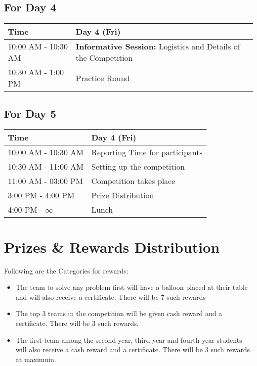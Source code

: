 \documentclass[12pt]{article}
\begin{document}
\subsection*{\centering For Day 4}
\begin{table}[H]
    \centering
    \begin{tabular}{|p{2.1cm}|p{12.9cm}|}
    \hline
    Time & Day 4 (Fri) \\ 
    \hline
    10:00 AM - 10:30 AM & \textbf{Informative Session:} Logistics and Details of the Competition \\
    \hline
    10:30 AM - 1:00 PM & Practice Round \\
    \hline
    \end{tabular}
\end{table}

\subsection*{\centering For Day 5}
\begin{table}[H]
    \centering
    \begin{tabular}{|p{2.1cm}|p{12.9cm}|}
    \hline
    Time & Day 4 (Fri) \\ 
    \hline
    10:00 AM - 10:30 AM & Reporting Time for participants \\
    \hline
    10:30 AM - 11:00 AM & Setting up the competition \\
    \hline
    11:00 AM - 03:00 PM & Competition takes place \\
    \hline
    3:00 PM - 4:00 PM & Prize Distribution \\
    \hline
    4:00 PM - $\infty$ & Lunch \\
    \hline
    \end{tabular}
\end{table}

\section*{\centering Prizes \& Rewards Distribution}
Following are the Categories for rewards:
\begin{itemize}
    \item The team to solve any problem first will have a balloon placed at their table and will also receive a certificate. There will be 7 such rewards
    \item The top 3 teams in the competition will be given cash reward and a certificate. There will be 3 such rewards.
    \item The first team among the second-year, third-year and fourth-year students will also receive a cash reward and a certificate. There will be 3 such rewards at maximum.
    
\end{itemize}
\end{document}
